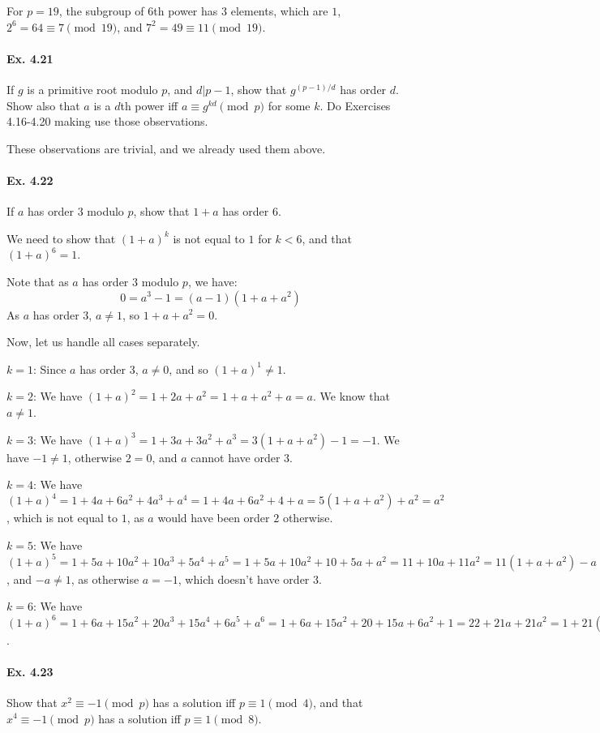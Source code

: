 \documentclass[notitlepage]{article}
\theoremstyle{definition}
\begin{document}
For $p = 19$, the subgroup of $6$th power has $3$ elements, which are
$1$, $2^6 = 64 \equiv 7 \pmod {19}$, and $7^2 = 49 \equiv 11 \pmod
{19}$.

\paragraph{Ex. 4.21}
If $g$ is a primitive root modulo $p$, and $d|p-1$, show that
$g^{(p-1)/d}$ has order $d$. Show also that $a$ is a $d$th power iff
$a \equiv g^{kd} \pmod p$ for some $k$. Do Exercises 4.16-4.20 making
use those observations.

These observations are trivial, and we already used them above.

\paragraph{Ex. 4.22}
If $a$ has order $3$ modulo $p$, show that $1+a$ has order $6$.

We need to show that $(1+a)^k$ is not equal to $1$ for $k < 6$, and
that $(1+a)^6 = 1$.

Note that as $a$ has order $3$ modulo $p$, we have:
\begin{equation}
  0 = a^3 - 1 = (a-1)(1+a+a^2)
\end{equation}
As $a$ has order $3$, $a \ne 1$, so $1+a+a^2 = 0$.

Now, let us handle all cases separately.

$k=1$: Since $a$ has order 3, $a \ne 0$, and so $(1+a)^1 \ne 1$.

$k=2$: We have $(1+a)^2 = 1 + 2a + a^2 = 1 + a + a^2 + a = a$. We know
that $a \ne 1$.

$k=3$: We have $(1+a)^3 = 1 + 3a + 3a^2 + a^3 = 3(1+a+a^2)-1 = -1$. We
have $-1 \ne 1$, otherwise $2 = 0$, and $a$ cannot have order $3$.

$k=4$: We have $(1+a)^4 = 1 + 4a + 6a^2 + 4a^3 + a^4 = 1 + 4a + 6a^2 +
4 + a = 5(1 + a + a^2) + a^2 = a^2$, which is not equal to $1$, as $a$
would have been order $2$ otherwise.

$k=5$: We have $(1+a)^5 = 1 + 5a + 10a^2 + 10a^3 + 5a^4 + a^5 = 1 + 5a
+ 10a^2 + 10 + 5a + a^2 = 11 + 10a + 11a^2 = 11(1+a+a^2) - a = -a$,
and $-a \ne 1$, as otherwise $a =-1$, which doesn't have order $3$.

$k=6$: We have $(1+a)^6 = 1 + 6a + 15a^2 + 20a^3 + 15a^4 + 6a^5 + a^6
= 1 + 6a + 15a^2 + 20 + 15a + 6a^2 + 1 = 22 + 21a + 21a^2 = 1 +
21(1+a+a^2) = 1$.

\paragraph{Ex. 4.23}
Show that $x^2 \equiv -1 \pmod p$ has a solution iff $p \equiv 1 \pmod
4$, and that $x^4 \equiv -1 \pmod p$ has a solution iff $p \equiv 1
\pmod 8$.
\end{document}
